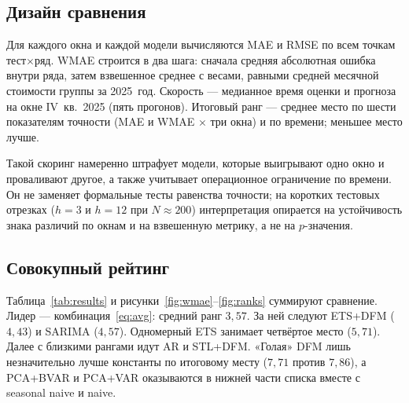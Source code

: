 \documentclass[12pt]{article}
\begin{document}
\subsection{Дизайн сравнения}

Для каждого окна и каждой модели вычисляются MAE и RMSE по всем точкам тест$\times$ряд. WMAE строится в два шага: сначала средняя абсолютная ошибка внутри ряда, затем взвешенное среднее с весами, равными средней месячной стоимости группы за 2025~год. Скорость --- медианное время оценки и прогноза на окне IV~кв.~2025 (пять прогонов). Итоговый ранг --- среднее место по шести показателям точности (MAE и WMAE $\times$ три окна) и по времени; меньшее место лучше.

Такой скоринг намеренно штрафует модели, которые выигрывают одно окно и проваливают другое, а также учитывает операционное ограничение по времени. Он не заменяет формальные тесты равенства точности; на коротких тестовых отрезках ($h=3$ и $h=12$ при $N\approx 200$) интерпретация опирается на устойчивость знака различий по окнам и на взвешенную метрику, а не на $p$-значения.

\subsection{Совокупный рейтинг}

Таблица~\ref{tab:results} и рисунки~\ref{fig:wmae}--\ref{fig:ranks} суммируют сравнение. Лидер --- комбинация~\eqref{eq:avg}: средний ранг $3{,}57$. За ней следуют ETS+DFM ($4{,}43$) и SARIMA ($4{,}57$). Одномерный ETS занимает четвёртое место ($5{,}71$). Далее с близкими рангами идут AR и STL+DFM. «Голая» DFM лишь незначительно лучше константы по итоговому месту ($7{,}71$ против $7{,}86$), а PCA+BVAR и PCA+VAR оказываются в нижней части списка вместе с seasonal naive и naive.
\end{document}
